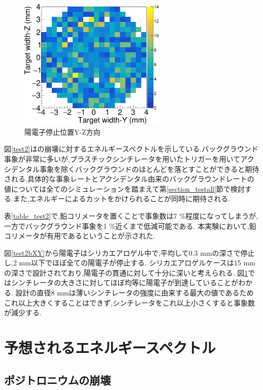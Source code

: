 \begin{figure}[htbp]
	\centering
		\includegraphics[width=7cm]{fig/test2bYZ.pdf}
	\caption{陽電子停止位置Y-Z方向}
	\label{test2bYZ}
\end{figure}


図\ref{test2}はの崩壊に対するエネルギースペクトルを示している.バックグラウンド事象が非常に多いが,プラスチックシンチレータを用いたトリガーを用いてアクシデンタル事象を除くバックグラウンドのほとんどを落とすことができると期待される.具体的な事象レートとアクシデンタル由来のバックグラウンドレートの値については全てのシミュレーションを踏まえて第\ref{section_testall}節で検討する.また,エネルギーによるカットをかけられることが同時に期待される.

表\ref{table_test2}で,鉛コリメータを置くことで事象数は7 \%程度になってしまうが,一方でバックグラウンド事象を1 \%近くまで低減可能である.
本実験において,鉛コリメータが有用であるということが示された.

図\ref{test2bXY}から陽電子はシリカエアロゲル中で,平均して0.3 mmの深さで停止し,2 mm以下でほぼ全ての陽電子が停止する.
シリカエアロゲルケースは15 mmの深さで設計されており,陽電子の貫通に対して十分に深いと考えられる.
図\ref{test2bYZ}ではシンチレータの大きさに対してほぼ均等に陽電子が到達していることがわかる.
設計の直径8 mmは薄いシンチレータの強度に由来する最大の値であるためこれ以上大きくすることはできず,シンチレータをこれ以上小さくすると事象数が減少する.


\section{予想されるエネルギースペクトル}
\label{section_test3}

\subsection{ポジトロニウムの崩壊}

